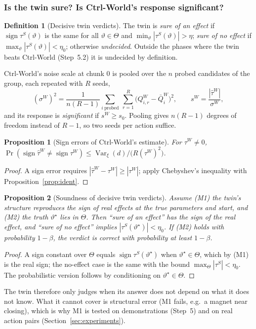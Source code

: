 \documentclass[11pt,a4paper]{article}
\theoremstyle{plain}
\newtheorem{proposition}{Proposition}
\theoremstyle{definition}
\newtheorem{definition}{Definition}
\theoremstyle{remark}
\DeclareMathOperator{\sign}{sign}
\DeclareMathOperator{\Var}{Var}
\begin{document}
\subsubsection{Is the twin sure? Is Ctrl-World's response significant?}
\begin{definition}[Decisive twin verdicts]
The twin is \emph{sure of an effect} if $\sign\tau^S(\vartheta)$ is the same for all $\vartheta\in\Theta$ and $\min_\vartheta|\tau^S(\vartheta)|>\eta$; \emph{sure of no effect} if $\max_\vartheta|\tau^S(\vartheta)|<\eta_0$; otherwise \emph{undecided}. Outside the phases where the twin beats Ctrl-World (Step~5.2) it is undecided by definition.
\end{definition}
Ctrl-World's noise scale at chunk 0 is pooled over the $n$ probed candidates of the group, each repeated with $R$ seeds,
\begin{equation}
(\sigma^W)^2=\frac{1}{n(R-1)}\sum_{i\ \mathrm{probed}}\ \sum_{r=1}^{R}\big(Q^W_{i,r}-\bar Q^W_i\big)^2,\qquad s^W=\frac{|\hat\tau^W|}{\sigma^W},
\end{equation}
and its response is \emph{significant} if $s^W\ge s_0$. Pooling gives $n(R-1)$ degrees of freedom instead of $R-1$, so two seeds per action suffice.

\begin{proposition}[Sign errors of Ctrl-World's estimate]\label{prop:signW}
For $\tau^W\neq0$, $\Pr(\sign\hat\tau^W\neq\sign\tau^W)\le\Var_\xi(d)/\big(R(\tau^W)^2\big)$.
\end{proposition}
\begin{proof}
A sign error requires $|\hat\tau^W-\tau^W|\ge|\tau^W|$; apply Chebyshev's inequality with Proposition~\ref{prop:ident}.
\end{proof}

\begin{proposition}[Soundness of decisive twin verdicts]\label{prop:sound}
Assume (M1) the twin's structure reproduces the sign of real effects at the true parameters and start, and (M2) the truth $\vartheta^\star$ lies in $\Theta$. Then ``sure of an effect'' has the sign of the real effect, and ``sure of no effect'' implies $|\tau^S(\vartheta^\star)|<\eta_0$. If (M2) holds with probability $1-\beta$, the verdict is correct with probability at least $1-\beta$.
\end{proposition}
\begin{proof}
A sign constant over $\Theta$ equals $\sign\tau^S(\vartheta^\star)$ when $\vartheta^\star\in\Theta$, which by (M1) is the real sign; the no-effect case is the same with the bound $\max_\Theta|\tau^S|<\eta_0$. The probabilistic version follows by conditioning on $\vartheta^\star\in\Theta$.
\end{proof}
The twin therefore only judges when its answer does not depend on what it does not know. What it cannot cover is structural error (M1 fails, e.g.\ a magnet near closing), which is why M1 is tested on demonstrations (Step~5) and on real action pairs (Section~\ref{sec:experiments}).
\end{document}
